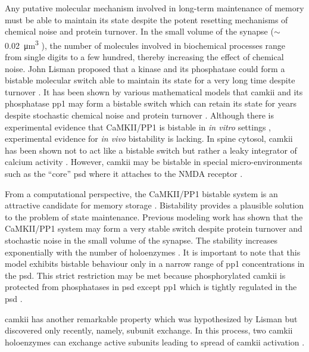 \documentclass[9pt,lineno,doublespacing]{elife}
\begin{document}
Any putative molecular mechanism involved in long-term maintenance of memory
must be able to maintain its state despite the potent resetting mechanisms of
chemical noise and protein turnover. In the small volume of the synapse ($\sim$
\SI{0.02}{\cubic\micro\meter} \citep{bartol_nanoconnectomic_2015}), the number
of molecules involved in biochemical processes range from single digits to a few
hundred, thereby increasing the effect of chemical noise. John Lisman proposed
that a kinase and its phosphatase could form a bistable molecular switch able to
maintain its state for a very long time despite turnover
\citep{lisman_mechanism_1985}. It has been shown by various mathematical models
that \gls{camkii} and its phosphatase \gls{pp1} may form a bistable switch
\citep{zhabotinsky_bistability_2000} which can retain its state for years
despite stochastic chemical noise and protein turnover
\citep{miller_stability_2005,hayer_molecular_2005}. Although there is
experimental evidence that CaMKII/PP1 is bistable in \emph{in vitro} settings
\citep{bradshaw_ultrasensitive_2003,urakubo_vitro_2014}, experimental evidence
for \emph{in vivo} bistability is lacking. In spine cytosol, \gls{camkii} has
been shown not to act like a bistable switch but rather a leaky integrator of
calcium activity \citep{chang_camkii_2017}. However, \gls{camkii} may be
bistable in special micro-environments such as the ``core'' \gls{psd} where it
attaches to the NMDA receptor \citep{dosemeci_postsynaptic_2016,
petersen_distribution_2003}.

From a computational perspective, the CaMKII/PP1 bistable system is an attractive
candidate for memory storage \citep{koch_biophysics_2004}. Bistability provides
a plausible solution to the problem of state maintenance. Previous modeling work
has shown that the CaMKII/PP1 system may form a very stable switch despite protein 
turnover and stochastic noise in the small volume of the synapse. The stability
increases exponentially with the number of holoenzymes
\citep{miller_stability_2005}. It is important to note that this model exhibits
bistable behaviour only in a narrow range of \gls{pp1} concentrations in the
\gls{psd}. This strict restriction may be met because phosphorylated
\gls{camkii} is protected from phosphatases in \gls{psd} except \gls{pp1}
\citep{strack_differential_1997} which is tightly regulated in the \gls{psd}
\citep{bollen_extended_2010}. 

\gls{camkii} has another remarkable property which was hypothesized by Lisman
\citep{lisman_cam_1994} but discovered only recently, namely, subunit exchange.
In this process, two \gls{camkii} holoenzymes can exchange active subunits
leading to spread of \gls{camkii} activation \citep{stratton_activation-triggered_2014}.
\end{document}
